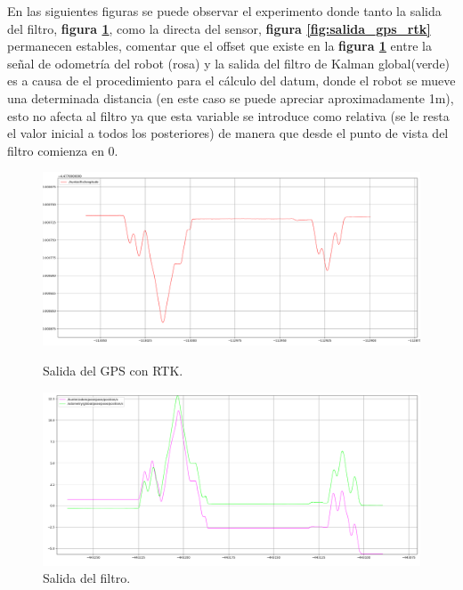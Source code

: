 En las siguientes figuras se puede observar el experimento donde tanto la salida del filtro, \textbf{figura \ref{fig:salida_ekf_rtk}}, como la 
directa del sensor, \textbf{figura \ref{fig:salida_gps_rtk}} permanecen estables, comentar que el offset que existe en la 
\textbf{figura \ref{fig:salida_ekf_rtk}} entre la señal de odometría del robot (rosa) y la salida del filtro de Kalman global(verde) es a causa de 
el procedimiento para el cálculo del datum, donde el robot se mueve una determinada distancia (en este caso se puede apreciar aproximadamente 1m), esto no afecta al filtro ya que esta variable se introduce como relativa (se le resta el valor inicial a todos los posteriores) de manera 
que desde el punto de vista del filtro comienza en 0.

\begin{figure}[htbp]
  \centering
    \captionsetup{skip=0pt}  %
  \begin{minipage}[b]{0.7\textwidth}
    \centering
    \includegraphics[width=\textwidth]{images/longitude_gps.png}
    \caption{Salida del GPS con RTK.}
    \label{fig:salida_gps_rtk}
  \end{minipage}
  \hfill
  \begin{minipage}[b]{0.7\textwidth} 
    \centering
    \includegraphics[width=\textwidth]{images/odom_global_rtk.png}
    \caption{Salida del filtro.}
    \label{fig:salida_ekf_rtk}
  \end{minipage}
\end{figure}

